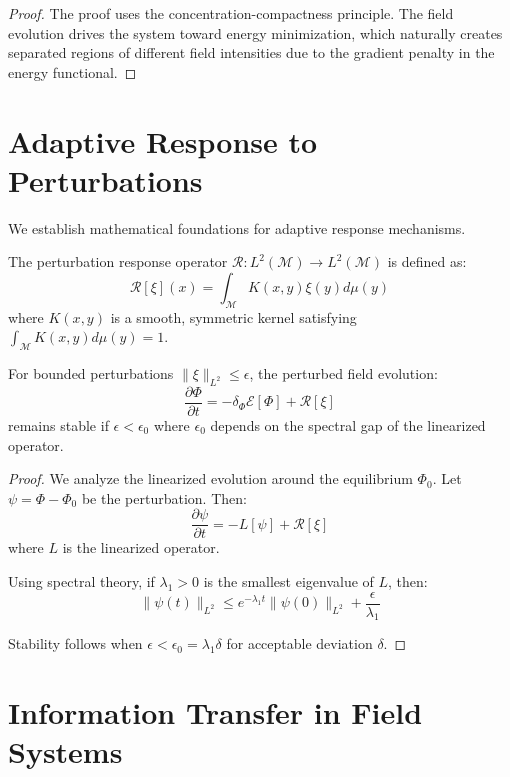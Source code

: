 \begin{proof}
The proof uses the concentration-compactness principle. The field evolution drives the system toward energy minimization, which naturally creates separated regions of different field intensities due to the gradient penalty in the energy functional.
\end{proof}

\section{Adaptive Response to Perturbations}

We establish mathematical foundations for adaptive response mechanisms.

\begin{definition}
\label{def:perturbation_response}
The perturbation response operator $\mathcal{R}: L^2(\mathcal{M}) \to L^2(\mathcal{M})$ is defined as:
$$\mathcal{R}[\xi](x) = \int_{\mathcal{M}} K(x,y) \xi(y) d\mu(y)$$
where $K(x,y)$ is a smooth, symmetric kernel satisfying $\int_{\mathcal{M}} K(x,y) d\mu(y) = 1$.
\end{definition}

\begin{theorem}
\label{thm:perturbation_stability}
For bounded perturbations $\|\xi\|_{L^2} \leq \epsilon$, the perturbed field evolution:
$$\frac{\partial \Phi}{\partial t} = -\delta_\Phi \mathcal{E}[\Phi] + \mathcal{R}[\xi]$$
remains stable if $\epsilon < \epsilon_0$ where $\epsilon_0$ depends on the spectral gap of the linearized operator.
\end{theorem}

\begin{proof}
We analyze the linearized evolution around the equilibrium $\Phi_0$. Let $\psi = \Phi - \Phi_0$ be the perturbation. Then:
$$\frac{\partial \psi}{\partial t} = -L[\psi] + \mathcal{R}[\xi]$$
where $L$ is the linearized operator.

Using spectral theory, if $\lambda_1 > 0$ is the smallest eigenvalue of $L$, then:
$$\|\psi(t)\|_{L^2} \leq e^{-\lambda_1 t}\|\psi(0)\|_{L^2} + \frac{\epsilon}{\lambda_1}$$

Stability follows when $\epsilon < \epsilon_0 = \lambda_1 \delta$ for acceptable deviation $\delta$.
\end{proof}

\section{Information Transfer in Field Systems}

